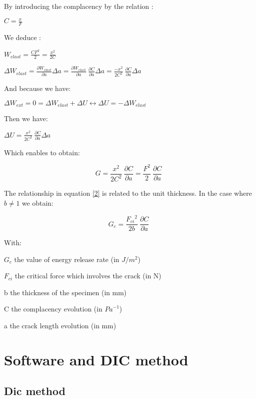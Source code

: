 By introducing the complacency by the relation :

$C=\frac{x}{F}$

We deduce :

$W_{elast}=\frac{CF^2}{2}=\frac{x^2}{2C}$

$\Delta W_{elast}=\frac{\partial W_{elast}}{\partial a}\Delta a=\frac{\partial W_{elast}}{\partial a}\ \frac{\partial C}{\partial a}\Delta a=\frac{-x^2}{2C^2}\ \frac{\partial C}{\partial a}\Delta a$

And because we have:

$\Delta W_{ext}=0=\Delta W_{elast}+\Delta U\leftrightarrow \Delta U =-\Delta W_{elast}$

Then we have:

$\Delta U=\frac{x^2}{2C^2}\ \frac{\partial C}{\partial a}\Delta a$

Which enables to obtain:

\begin{equation}
	G=\frac{x^2}{2C^2}\ \frac{\partial C}{\partial a}=\frac{F^2}{2}\ \frac{\partial C}{\partial a}
	\label{2}
\end{equation}

The relationship in equation \ref{2} is related to the unit thickness. In the case where $b\neq1$
we obtain:

\begin{equation}
	G_c=\frac{{F_{ci}}^2}{2b}\ \frac{\partial C}{\partial a}
	\label{3}
\end{equation}

With:

$G_c$ the value of energy release rate (in $J/m^2$)

$F_{ci}$ the critical force which involves the crack (in N)

b the thickness of the specimen (in mm)

C the complacency evolution (in ${Pa}^{-1}$)

a the crack length evolution (in mm)



\section{Software and DIC method}

\subsection{Dic method}

